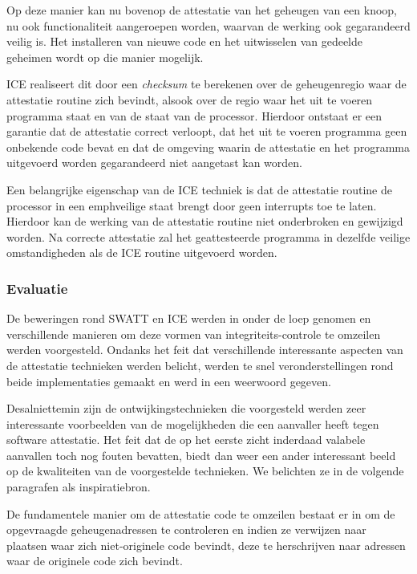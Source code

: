 Op deze manier kan nu bovenop de attestatie van het geheugen van een knoop, nu
ook functionaliteit aangeroepen worden, waarvan de werking ook gegarandeerd
veilig is. Het installeren van nieuwe code en het uitwisselen van gedeelde
geheimen wordt op die manier mogelijk.

ICE realiseert dit door een \emph{checksum} te berekenen over de geheugenregio
waar de attestatie routine zich bevindt, alsook over de regio waar het uit te
voeren programma staat en van de staat van de processor. Hierdoor ontstaat er
een garantie dat de attestatie correct verloopt, dat het uit te voeren
programma geen onbekende code bevat en dat de omgeving waarin de attestatie en
het programma uitgevoerd worden gegarandeerd niet aangetast kan worden.

Een belangrijke eigenschap van de ICE techniek is dat de attestatie routine de
processor in een emph{veilige} staat brengt door geen interrupts toe te laten.
Hierdoor kan de werking van de attestatie routine niet onderbroken en gewijzigd
worden. Na correcte attestatie zal het geattesteerde programma in dezelfde
veilige omstandigheden als de ICE routine uitgevoerd worden.

\subsubsection*{Evaluatie}

De beweringen rond SWATT en ICE werden in \cite{castelluccia2009difficulty}
onder de loep genomen en verschillende manieren om deze vormen van
integriteits-controle te omzeilen werden voorgesteld. Ondanks het feit dat
verschillende interessante aspecten van de attestatie technieken werden
belicht, werden te snel veronderstellingen rond beide implementaties gemaakt en
werd in \cite{perrig2010refutation} een weerwoord gegeven.

Desalniettemin zijn de ontwijkingstechnieken die voorgesteld werden zeer
interessante voorbeelden van de mogelijkheden die een aanvaller heeft tegen
software attestatie. Het feit dat de op het eerste zicht inderdaad valabele
aanvallen toch nog fouten bevatten, biedt dan weer een ander interessant beeld
op de kwaliteiten van de voorgestelde technieken. We belichten ze in de
volgende paragrafen als inspiratiebron.

De fundamentele manier om de attestatie code te omzeilen bestaat er in om de
opgevraagde geheugenadressen te controleren en indien ze verwijzen naar
plaatsen waar zich niet-originele code bevindt, deze te herschrijven naar
adressen waar de originele code zich bevindt.

